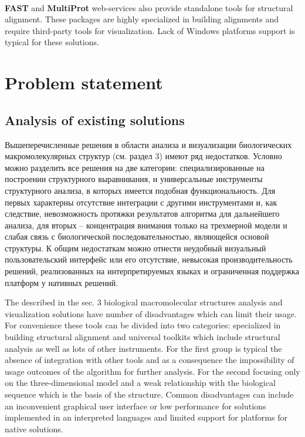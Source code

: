 \documentclass[a4paper, 12pt, titlepage, utf8]{extarticle}
\let\oldsection\section         %
\renewcommand{\section}{\newpage\oldsection}
\begin{document}
\begin{original}
\begin{original}
\paragraph{}
\textbf{FAST} and \textbf{MultiProt} web-services also provide standalone tools
for structural alignment. These packages are highly specialized in building
alignments and require third-party tools for visualization. Lack of Windows
platforms support is typical for these solutions.


\section{Problem statement}	%

\subsection{Analysis of existing solutions}
\begin{original}
Вышеперечисленные решения в области анализа и визуализации биологических
макромолекулярных структур (см. раздел 3) имеют ряд недостатков. Условно можно
разделить все решения на две категории: специализированные на построении
структурного выравнивания, и универсальные инструменты структурного анализа, в
которых имеется подобная функциональность. Для первых характерны отсутствие
интеграции с другими инструментами и, как следствие, невозможность протяжки
результатов алгоритма для дальнейшего анализа, для вторых -- концентрация
внимания только на трехмерной модели и слабая связь с биологической
последовательностью, являющейся основой структуры. К общим недостаткам можно
отнести неудобный визуальный пользовательский интерфейс или его отсутствие,
невысокая производительность решений, реализованных на интерпретируемых языках и
ограниченная поддержка платформ у нативных решений.
\end{original}

The described in the sec. 3 biological macromolecular structures analysis and
visualization solutions have number of disadvantages which can limit their
usage. For convenience these tools can be divided into two categories:
specialized in building structural alignment and universal toolkits which
include structural analysis as well as lots of other instruments. For the first
group is typical the absence of integration with other tools and as a consequence
the impossibility of usage outcomes of the algorithm for further analysis. For
the second focusing only on the three-dimensional model and a weak relationship
with the biological sequence  which is the basis of the structure. Common
disadvantages can include an inconvenient graphical user interface or low
performance for solutions implemented in an interpreted languages and limited
support for platforms for native solutions.


\end{original}
\end{original}
\end{document}
